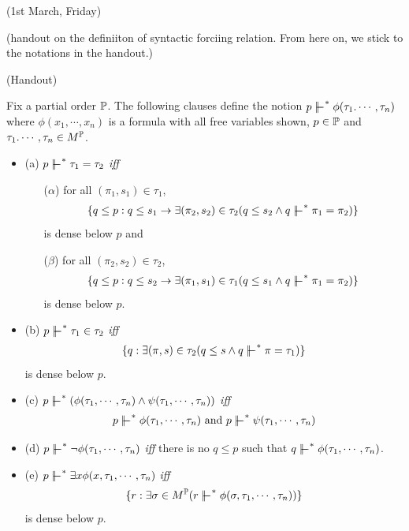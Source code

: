 \documentclass[12pt,a4paper]{article}
\renewenvironment{i}
{\begin{itemize} 
	}%
	{\end{itemize}
}
\begin{document}
\newday

(1st March, Friday)
\s

(handout on the definiiton of syntactic forciing relation. From here on, we stick to the notations in the handout.)

\newday

(Handout)
\s

 Fix a partial order $\mathbb{P}$. The following clauses define the notion $p\forces^* \phi(\tau_1. \cdots, \tau_n)$ where $\phi(x_1, \cdots, x_n)$ is a formula with all free variables shown, $p\in\mathbb{P}$ and $\tau_1. \cdots, \tau_n \in M^{\mathbb{P}}$.
\begin{i}
\item[(a)] $p\forces^* \tau_1 = \tau_2$ \emph{iff}
\begin{itemize}
\item[($\alpha$)] for all $(\pi_1, s_1) \in \tau_1$,
\begin{align*}
\{ q\leq p : q\leq s_1 \rightarrow \exists (\pi_2, s_2) \in \tau_2 (q\leq s_2 \wedge q\forces^* \pi_1 = \pi_2) \}
\end{align*}
is dense below $p$ and
\item[($\beta$)] for all $(\pi_2, s_2) \in \tau_2$,
\begin{align*}
\{ q\leq p : q\leq s_2 \rightarrow \exists (\pi_1, s_1) \in \tau_1 (q\leq s_1 \wedge q\forces^* \pi_1 = \pi_2) \}
\end{align*}
is dense below $p$.
\end{itemize}
\item[(b)] $p\forces^* \tau_1 \in \tau_2$ \emph{iff}
\begin{align*}
\{ q: \exists (\pi, s) \in \tau_2 (q\leq s \wedge q \forces^* \pi =\tau_1) \}
\end{align*}
is dense below $p$.
\item[(c)] $p\forces^* (\phi(\tau_1, \cdots, \tau_n) \wedge \psi(\tau_1, \cdots, \tau_n))$ \emph{iff}
\begin{align*}
p\forces^* \phi(\tau_1, \cdots, \tau_n) \text{ and } p\forces^* \psi(\tau_1, \cdots, \tau_n)
\end{align*}
\item[(d)] $p\forces^* \neg \phi(\tau_1, \cdots, \tau_n)$ \emph{iff} there is no $q\leq p$ such that $q\forces^* \phi(\tau_1, \cdots, \tau_n)$.
\item[(e)] $p\forces^* \exists x \phi(x, \tau_1, \cdots, \tau_n)$ \emph{iff}
\begin{align*}
\{ r: \exists \sigma \in M^{\poset} (r\forces^* \phi(\sigma, \tau_1, \cdots, \tau_n))\}
\end{align*}
is dense below $p$.
\end{i}
\newday
\s
\end{document}
